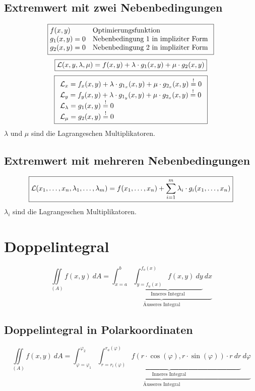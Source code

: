 \subsection{Extremwert mit zwei Nebenbedingungen}
\[ \boxed{\begin{array}{@{}ll}
f(x,y) & \text{Optimierungsfunktion} \\
g_1(x,y) = 0 & \text{Nebenbedingung 1 in impliziter Form} \\
g_2(x,y) = 0 & \text{Nebenbedingung 2 in impliziter Form} \\
\end{array}} \]
\[ \boxed{\mathcal{L}(x,y,\lambda,\mu) = f(x,y) + \lambda \cdot g_1(x,y) + \mu \cdot g_2(x,y)} \]
\[ \boxed{\begin{array}{l}
\mathcal{L}_x = f_x(x,y) + \lambda \cdot g_{1_x}(x,y) + \mu \cdot g_{2_x}(x,y) 
\stackrel{!}{=} 0 \\
\mathcal{L}_y = f_y(x,y) + \lambda \cdot g_{1_y}(x,y) + \mu \cdot g_{2_x}(x,y) 
\stackrel{!}{=} 0 \\
\mathcal{L}_\lambda = g_1(x,y) \stackrel{!}{=} 0 \\
\mathcal{L}_\mu = g_2(x,y) \stackrel{!}{=} 0 \\
\end{array}} \]
$\lambda$ und $\mu$ sind die Lagrangeschen Multiplikatoren. 

\subsection{Extremwert mit mehreren Nebenbedingungen}
\[ \boxed{\mathcal{L}(x_1, \dots, x_n, \lambda_1, \dots, \lambda_m) 
= f(x_1, \dots, x_n) 
+ \sum_{i=1}^{m} \lambda_i \cdot g_i(x_1, \dots, x_n)} \]
$\lambda_i$ sind die Lagrangeschen Multiplikatoren. 

\section{Doppelintegral}
\[ \boxed{\iint\limits_{(A)} f(x,y) ~ dA 
= \underbrace{\int_{x=a}^{b} 
\underbrace{\int_{y=f_u(x)}^{f_o(x)} f(x,y) ~ dy}
_{\text{Inneres Integral}} ~ dx}
_{\text{Äusseres Integral}}} \]

\subsection{Doppelintegral in Polarkoordinaten}
\[ \boxed{\iint\limits_{(A)} f(x,y) ~ dA 
= \underbrace{\int_{\varphi=\varphi_1}^{\varphi_2} 
\underbrace{\int_{r=r_i(\varphi)}^{r_a(\varphi)} f(r \cdot \cos(\varphi), 
r \cdot \sin(\varphi)) \cdot r ~ dr}
_{\text{Inneres Integral}} ~ d\varphi}
_{\text{Äusseres Integral}}} \]

